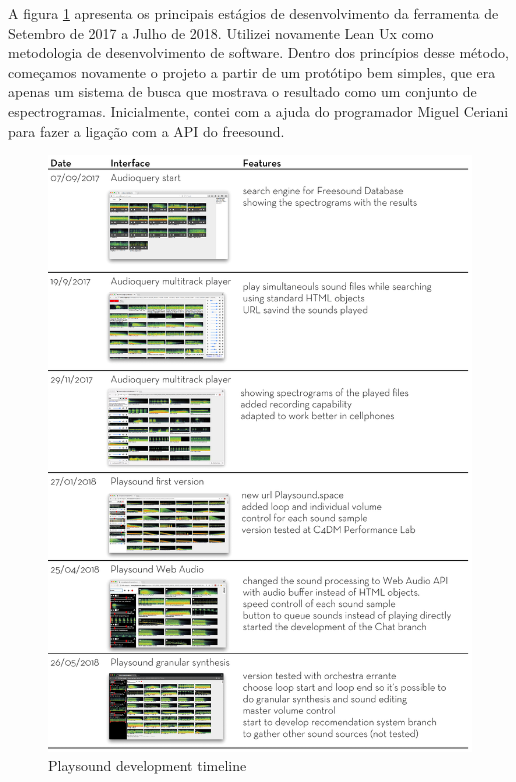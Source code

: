 A figura \ref{fig:timeline} apresenta os principais estágios de desenvolvimento da ferramenta de Setembro de 2017 a Julho de 2018. Utilizei novamente Lean Ux \cite{Liikkanen2014} como metodologia de desenvolvimento de software. Dentro dos princípios desse método, começamos novamente o projeto a partir de um protótipo bem simples, que era apenas um sistema de busca que mostrava o resultado como um conjunto de espectrogramas. Inicialmente, contei com a ajuda do programador Miguel Ceriani para fazer a ligação com a API do freesound.

\begin{figure}

\includegraphics[width=1\textwidth]{pictures/playsoundtimeline}
\caption{\label{pstimeline}Playsound development timeline}
\label{fig:timeline}
\end{figure}


